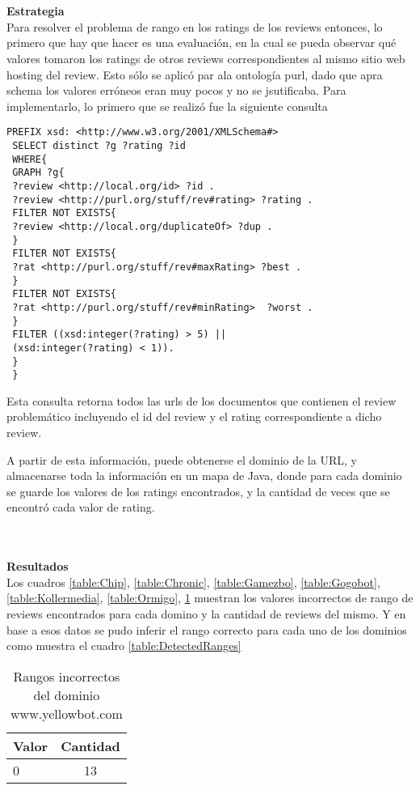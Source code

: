 ~\\\\\textbf{Estrategia}\\
Para resolver el problema de rango en los ratings de los reviews entonces, lo primero que hay que hacer es una evaluación, en la cual 
se pueda observar qué valores tomaron los ratings de otros reviews correspondientes al mismo sitio web hosting del review. 
Esto sólo se aplicó par ala ontología purl, dado que apra schema los valores erróneos eran muy pocos y no se jsutificaba.
Para implementarlo, lo primero que se realizó fue la siguiente consulta

\begin{lstlisting}[frame=single]
 PREFIX xsd: <http://www.w3.org/2001/XMLSchema#> 
 SELECT distinct ?g ?rating ?id 
 WHERE{
 GRAPH ?g{
 ?review <http://local.org/id> ?id .
 ?review <http://purl.org/stuff/rev#rating> ?rating .
 FILTER NOT EXISTS{
 ?review <http://local.org/duplicateOf> ?dup .
 }
 FILTER NOT EXISTS{
 ?rat <http://purl.org/stuff/rev#maxRating> ?best .
 }
 FILTER NOT EXISTS{
 ?rat <http://purl.org/stuff/rev#minRating>  ?worst .
 }
 FILTER ((xsd:integer(?rating) > 5) ||
 (xsd:integer(?rating) < 1)).
 }
 }
\end{lstlisting}

Esta consulta retorna todos las urls de los documentos que contienen el review problemático incluyendo el id del review y el 
rating correspondiente a dicho review.

A partir de esta información, puede obtenerse el dominio de la URL, y almacenarse toda la información en un mapa de Java, donde para cada dominio se 
guarde los valores de los ratings encontrados, y la cantidad de veces que se encontró cada valor de rating.

~\\\\\textbf{Resultados}\\
Los cuadros \ref{table:Chip}, \ref{table:Chronic}, \ref{table:Gamezbo}, \ref{table:Gogobot}, \ref{table:Kollermedia}, \ref{table:Ormigo}, \ref{table:YellowBot} muestran 
los valores incorrectos de rango de reviews encontrados para cada domino y la cantidad de reviews del mismo. Y en base a esos datos 
se pudo inferir el rango correcto para cada uno de los dominios como muestra el cuadro \ref{table:DetectedRanges}

\begin{table}[h]
\begin{tabular}{| l | c |}\hline
 Valor & Cantidad\\\hline
 0 & 13\\\hline
\end{tabular}
\caption{Rangos incorrectos del dominio www.yellowbot.com}
\label{table:YellowBot}
\end{table}

